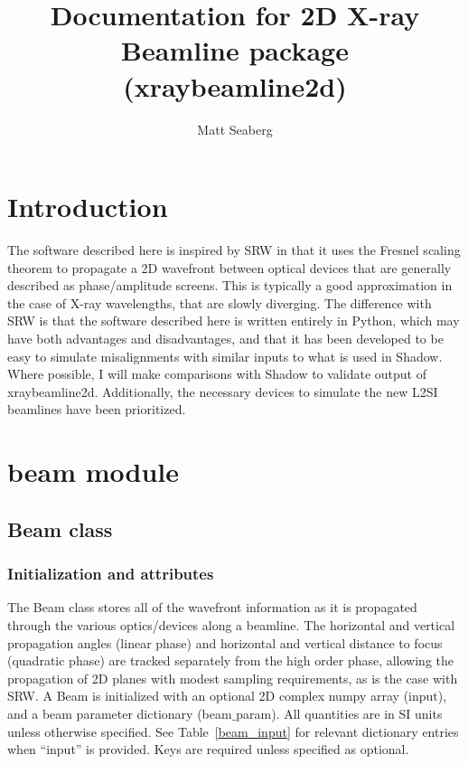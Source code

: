 \documentclass[11pt,fleqn]{article} %
\title{Documentation for 2D X-ray Beamline package (xraybeamline2d)}
\author{Matt Seaberg}
\begin{document}
\maketitle

\section{Introduction}
The software described here is inspired by SRW in that it uses the Fresnel scaling theorem to propagate a 2D wavefront between optical devices that are generally described as phase/amplitude screens. This is typically a good approximation in the case of X-ray wavelengths, that are slowly diverging. The difference with SRW is that the software described here is written entirely in Python, which may have both advantages and disadvantages, and that it has been developed to be easy to simulate misalignments with similar inputs to what is used in Shadow. Where possible, I will make comparisons with Shadow to validate output of xraybeamline2d. Additionally, the necessary devices to simulate the new L2SI beamlines have been prioritized. 

\section{beam module}

\subsection{Beam class}
\subsubsection{Initialization and attributes}
The Beam class stores all of the wavefront information as it is propagated through the various optics/devices along a beamline. The horizontal and vertical propagation angles (linear phase) and horizontal and vertical distance to focus (quadratic phase) are tracked separately from the high order phase, allowing the propagation of 2D planes with modest sampling requirements, as is the case with SRW. A Beam is initialized with an optional 2D complex numpy array (input), and a beam parameter dictionary (beam$\_$param). All quantities are in SI units unless otherwise specified. See Table~\ref{beam_input} for relevant dictionary entries when ``input'' is provided. Keys are required unless specified as optional.
\end{document}
